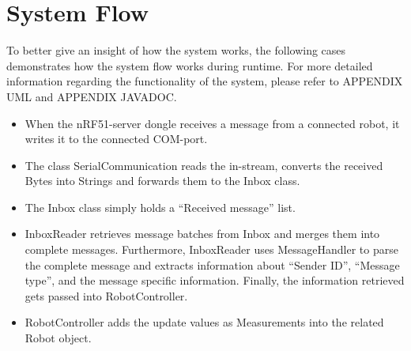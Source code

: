 \section{System Flow}




To better give an insight of how the system works, the following cases demonstrates how the system flow works during runtime. For more detailed information regarding the functionality of the system, please refer to APPENDIX UML and APPENDIX JAVADOC.

\begin{itemize}
    \item When the nRF51-server dongle receives a message from a connected robot, it writes it to the connected COM-port.
    \item The class SerialCommunication reads the in-stream, converts the received Bytes into Strings and forwards them to the Inbox class.
    \item The Inbox class simply holds a ``Received message'' list.
    \item InboxReader retrieves message batches from Inbox and merges them into complete messages. Furthermore, InboxReader uses MessageHandler to parse the complete message and extracts information about ``Sender ID'', ``Message type'', and the message specific information. Finally, the information retrieved gets passed into RobotController.
    \item RobotController adds the update values as Measurements into the related Robot object.
\end{itemize}

